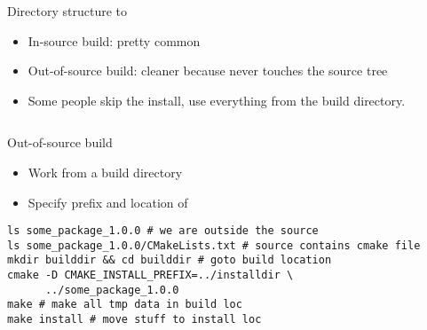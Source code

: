 \begin{numberedframe}{Directory structure}
  \hbox to \textwidth\bgroup
  \begin{minipage}{.45\textwidth}
  \end{minipage}
  \hss
  \begin{minipage}{.45\textwidth}
  \end{minipage}
  \egroup
  \begin{itemize}
  \item In-source build: pretty common
  \item Out-of-source build: cleaner because never touches the source tree
  \item Some people skip the install, use everything from the build directory.
  \end{itemize}
\begin{lstlisting}
\end{lstlisting}
\end{numberedframe}

\begin{numberedframe}{Out-of-source build}
  \begin{itemize}
  \item Work from a build directory
  \item Specify prefix and location of 
  \end{itemize}
\lstset{numbers=left,numberstyle=\tiny}
\begin{lstlisting}
ls some_package_1.0.0 # we are outside the source
ls some_package_1.0.0/CMakeLists.txt # source contains cmake file
mkdir builddir && cd builddir # goto build location
cmake -D CMAKE_INSTALL_PREFIX=../installdir \
      ../some_package_1.0.0
make # make all tmp data in build loc
make install # move stuff to install loc
\end{lstlisting}
\end{numberedframe}


